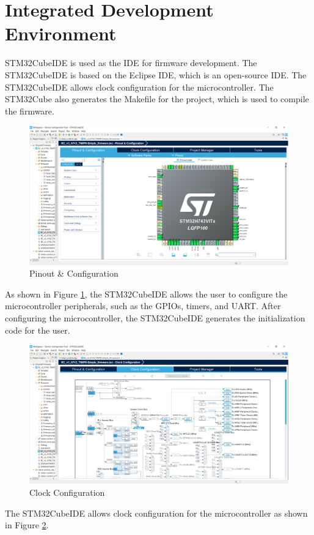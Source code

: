 \section{Integrated Development Environment}
STM32CubeIDE is used as the IDE for firmware development.
The STM32CubeIDE is based on the Eclipse IDE, which is an open-source IDE. The STM32CubeIDE allows clock configuration for the microcontroller.
The STM32Cube also generates the Makefile for the project, which is used to compile the firmware.
\begin {figure}[h]
\centering
\includegraphics[width=.8\textwidth]{Pinout & Configuration}
\caption{Pinout \& Configuration}
\label{fig:Pinout}
\end {figure}

As shown in Figure \ref{fig:Pinout}, the STM32CubeIDE allows the user to configure the microcontroller peripherals, such as the GPIOs, timers, and UART. After configuring the microcontroller, the STM32CubeIDE generates the initialization code for the user.
\begin {figure}[h]
\centering
\includegraphics[width=.8\textwidth]{Clock Configuration}
\caption{Clock Configuration}
\label{fig:clock}
\end {figure}

The STM32CubeIDE allows clock configuration for the microcontroller as shown in Figure \ref{fig:clock}.



